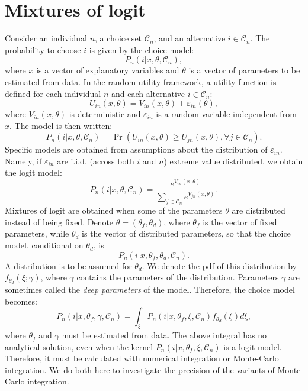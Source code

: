 \documentclass[12pt,a4paper]{article}
\newcommand{\C}{\mathcal{C}}
\newcommand{\prob}{\operatorname{Pr}}
\begin{document}
\section{Mixtures of logit}

Consider an
individual $n$, a choice set $\C_n$, and an alternative $i\in\C_n$. The
probability to choose $i$ is given by the choice model:
\begin{equation}
P_n(i|x,\theta,\C_n), 
\end{equation}
where $x$ is a vector of explanatory variables and $\theta$ is a vector
of parameters to be estimated from data. In the random utility framework,
a utility function is defined for each individual $n$ and each
alternative $i\in\C_n$:
\begin{equation}
U_{in}(x,\theta)= V_{in}(x,\theta) + \varepsilon_{in}(\theta),
\end{equation}
where $V_{in}(x,\theta)$ is deterministic and $\varepsilon_{in}$ is a
random variable independent from $x$. The model is then written:
\begin{equation}
P_n(i|x,\theta,\C_n) = \prob(U_{in}(x,\theta) \geq U_{jn}(x,\theta), \forall j \in \C_n).
\end{equation}
Specific models are obtained from assumptions about the distribution
of $\varepsilon_{in}$. Namely, if $\varepsilon_{in}$ are
i.i.d. (across both $i$ and $n$) extreme value distributed, we obtain
the logit model: 
\begin{equation}
P_n(i|x,\theta,\C_n) = \frac{e^{V_{in}(x,\theta)}}{\sum_{j\in\C_n}e^{V_{jn}(x,\theta)}}.
\end{equation}
Mixtures of logit are obtained when some of the parameters $\theta$
are distributed instead of being fixed. Denote
$\theta=(\theta_f,\theta_d)$, where $\theta_f$ is the vector of fixed
parameters, while $\theta_d$ is the vector of distributed parameters,
so that the choice model, conditional on $\theta_d$, is 
\begin{equation}
P_n(i|x,\theta_f,\theta_d,\C_n).
\end{equation}
A distribution is to be assumed for $\theta_d$. We denote the pdf of
this distribution by $f_{\theta_d}(\xi;\gamma)$, where $\gamma$ contains the
parameters of the distribution. Parameters $\gamma$ are sometimes
called the \emph{deep parameters} of the model. Therefore, the choice model becomes:
\begin{equation}
\label{eq:mixedLogit}
P_n(i|x,\theta_f,\gamma,\C_n) = \int_\xi P_n(i|x,\theta_f,\xi,\C_n) f_{\theta_d}(\xi)d\xi,
\end{equation}
where $\theta_f$ and $\gamma$ must be estimated from data.
The above integral has no analytical solution, even when the kernel
$P_n(i|x,\theta_f,\xi,\C_n)$ is a logit model. Therefore, it must be
calculated with numerical integration or Monte-Carlo integration. We
do both here to investigate the precision of the variants of
Monte-Carlo integration.  
\end{document}
